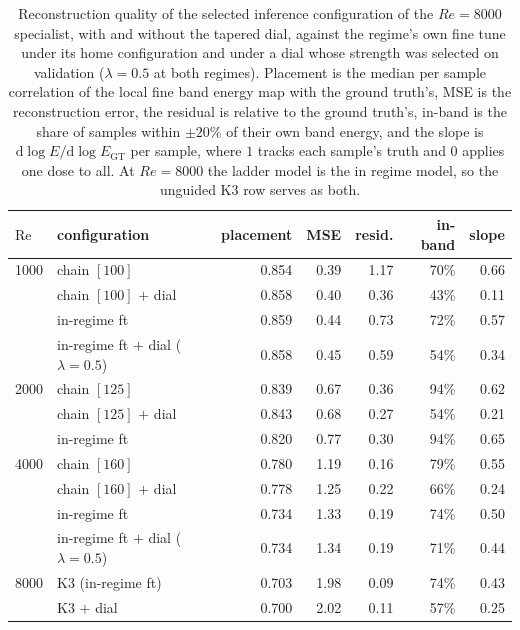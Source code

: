 \begin{table}[H]
  \centering
  \caption{Reconstruction quality of the selected inference configuration of the $Re{=}8000$ specialist, with and without the tapered dial, against the regime's own fine tune under its home configuration and under a dial whose strength was selected on validation ($\lambda{=}0.5$ at both regimes). Placement is the median per sample correlation of the local fine band energy map with the ground truth's, MSE is the reconstruction error, the residual is relative to the ground truth's, in-band is the share of samples within $\pm20\%$ of their own band energy, and the slope is $\mathrm{d}\log E/\mathrm{d}\log E_{\mathrm{GT}}$ per sample, where $1$ tracks each sample's truth and $0$ applies one dose to all. At $Re{=}8000$ the ladder model is the in regime model, so the unguided K3 row serves as both.}
  \label{tab:bestconfig-vs-home}
  \begin{tabular}{llrrrrr}
    \toprule
    $\mathrm{Re}$ & configuration & placement & MSE & resid. & in-band & slope \\
    \midrule
    1000 & chain $[100]$ & 0.854 & 0.39 & 1.17 & 70\% & 0.66 \\
     & chain $[100]$ $+$ dial & 0.858 & 0.40 & 0.36 & 43\% & 0.11 \\
     & in-regime ft & 0.859 & 0.44 & 0.73 & 72\% & 0.57 \\
     & in-regime ft $+$ dial ($\lambda{=}0.5$) & 0.858 & 0.45 & 0.59 & 54\% & 0.34 \\
    \midrule
    2000 & chain $[125]$ & 0.839 & 0.67 & 0.36 & 94\% & 0.62 \\
     & chain $[125]$ $+$ dial & 0.843 & 0.68 & 0.27 & 54\% & 0.21 \\
     & in-regime ft & 0.820 & 0.77 & 0.30 & 94\% & 0.65 \\
    \midrule
    4000 & chain $[160]$ & 0.780 & 1.19 & 0.16 & 79\% & 0.55 \\
     & chain $[160]$ $+$ dial & 0.778 & 1.25 & 0.22 & 66\% & 0.24 \\
     & in-regime ft & 0.734 & 1.33 & 0.19 & 74\% & 0.50 \\
     & in-regime ft $+$ dial ($\lambda{=}0.5$) & 0.734 & 1.34 & 0.19 & 71\% & 0.44 \\
    \midrule
    8000 & K3 (in-regime ft) & 0.703 & 1.98 & 0.09 & 74\% & 0.43 \\
     & K3 $+$ dial & 0.700 & 2.02 & 0.11 & 57\% & 0.25 \\
    \bottomrule
  \end{tabular}
\end{table}
